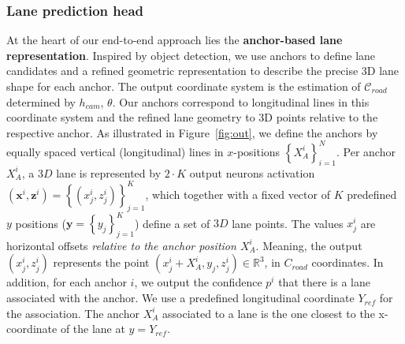 \documentclass[10pt,twocolumn,letterpaper]{article}
\begin{document}
\subsubsection{Lane prediction head}

At the heart of our end-to-end approach lies the \textbf{anchor-based lane representation}. Inspired by object detection, we use anchors to define lane candidates and a refined geometric representation to describe the precise 3D lane shape for each anchor. The output coordinate system is the estimation of $\mathcal{C}_{road}$ determined by $h_{cam}$, $\theta$. Our anchors correspond to longitudinal lines in this coordinate system and the refined lane geometry to 3D points relative to the respective anchor. As illustrated in Figure~\ref{fig:out}, we define the anchors by equally spaced vertical (longitudinal) lines in $x$-positions $\left\lbrace X_A^i \right\rbrace _{i=1}^{N}$. Per anchor $X_A^i$, a $3D$ lane is represented by $2\cdot  K$ output neurons activation $\left(\mathbf{x}^i,\mathbf{z}^i\right)=\left\lbrace \left(x_j^i,z_j^i\right)\right\rbrace_{j=1}^K$, which together with a fixed vector of $K$ predefined $y$ positions ($\mathbf{y}=\left\lbrace y_j \right\rbrace_{j=1}^K$) define a set of $3D$ lane points. The values $x_j^i$ are horizontal offsets \emph{relative to the anchor position $X_A^i$}. Meaning, the output $\left(x_j^i,z_j^i\right)$ represents the point $\left(x_j^i+X_A^i,y_j,z_j^i\right)\in\mathbb{R}^3$, in $C_{road}$ coordinates. In addition, for each anchor $i$, we output the confidence $p^i$ that there is a lane associated with the anchor. We use a predefined longitudinal coordinate $Y_{ref}$ for the association. The anchor $X_A^i$ associated to a lane is the one closest to the x-coordinate of the lane at $y=Y_{ref}$.
\end{document}
